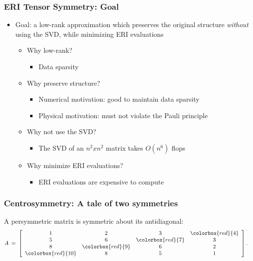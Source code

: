 \documentclass[bigger]{beamer}
\begin{document}
\begin{frame}
\frametitle{ERI Tensor Symmetry: Goal}
\label{sec-1-6}
\begin{itemize}

\item Goal: a low-rank approximation which preserves the original structure \emph{without} using the SVD, while minimizing ERI evaluations
\label{sec-1-6-1}%
\begin{itemize}

\item Why low-rank?
\label{sec-1-6-1-1}%
\begin{itemize}

\item Data sparsity
\label{sec-1-6-1-1-1}%
\end{itemize} %

\item Why preserve structure?
\label{sec-1-6-1-2}%
\begin{itemize}

\item Numerical motivation: good to maintain data sparsity
\label{sec-1-6-1-2-1}%

\item Physical motivation: must not violate the Pauli principle
\label{sec-1-6-1-2-2}%
\end{itemize} %

\item Why not use the SVD?
\label{sec-1-6-1-3}%
\begin{itemize}

\item The SVD of an $n^2xn^2$ matrix takes $O(n^6)$ flops
\label{sec-1-6-1-3-1}%
\end{itemize} %

\item Why minimize ERI evaluations?
\label{sec-1-6-1-4}%
\begin{itemize}

\item ERI evaluations are expensive to compute
\label{sec-1-6-1-4-1}%
\end{itemize} %
\end{itemize} %
\end{itemize} %
\end{frame}
\begin{frame}
\frametitle{Centrosymmetry: A tale of two symmetries}
\label{sec-1-7}

A persymmetric matrix is symmetric about its antidiagonal:
\[
A \:=\: 
\left[ 
\begin{array}{cccc}
1 & 2 & 3 & \colorbox{red}{4}\\
5 & 6 & \colorbox{red}{7} & 3 \\
8 & \colorbox{red}{9} & 6 & 2 \\
\colorbox{red}{10} & 8 & 5 & 1
\end{array} 
\right].
\]
\end{frame}
\end{document}
